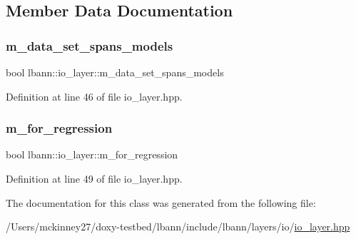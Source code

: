 \subsection{Member Data Documentation}
\mbox{\label{classlbann_1_1io__layer_a05c9d6e6cb12e8eb345ac6f5cb95644b}} 
\subsubsection{\texorpdfstring{m\+\_\+data\+\_\+set\+\_\+spans\+\_\+models}{m\_data\_set\_spans\_models}}
{\footnotesize\ttfamily bool lbann\+::io\+\_\+layer\+::m\+\_\+data\+\_\+set\+\_\+spans\+\_\+models\hspace{0.3cm}{\ttfamily [protected]}}



Definition at line 46 of file io\+\_\+layer.\+hpp.

\mbox{\label{classlbann_1_1io__layer_aa1410291168d197a59b47815cced48d4}} 
\subsubsection{\texorpdfstring{m\+\_\+for\+\_\+regression}{m\_for\_regression}}
{\footnotesize\ttfamily bool lbann\+::io\+\_\+layer\+::m\+\_\+for\+\_\+regression\hspace{0.3cm}{\ttfamily [private]}}



Definition at line 49 of file io\+\_\+layer.\+hpp.



The documentation for this class was generated from the following file\+:\begin{DoxyCompactItemize}
\item 
/\+Users/mckinney27/doxy-\/testbed/lbann/include/lbann/layers/io/\hyperlink{io__layer_8hpp}{io\+\_\+layer.\+hpp}\end{DoxyCompactItemize}
